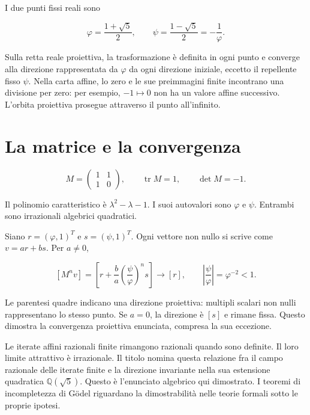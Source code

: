 \documentclass[10pt,a4paper]{article}
\begin{document}
I due punti fissi reali sono
\par

\[
\varphi=\frac{1+\sqrt5}{2},\qquad \psi=\frac{1-\sqrt5}{2}=-\frac1\varphi.
\]

Sulla retta reale proiettiva, la trasformazione è definita in ogni punto e converge alla direzione rappresentata da $\varphi$ da ogni direzione iniziale, eccetto il repellente fisso $\psi$. Nella carta affine, lo zero e le sue preimmagini finite incontrano una divisione per zero: per esempio, $-1\mapsto0$ non ha un valore affine successivo. L'orbita proiettiva prosegue attraverso il punto all'infinito.
\par

\section*{La matrice e la convergenza}

\[
M=\begin{pmatrix}1&1\\1&0\end{pmatrix},\qquad \operatorname{tr}M=1,\qquad \det M=-1.
\]

Il polinomio caratteristico è $\lambda^2-\lambda-1$. I suoi autovalori sono $\varphi$ e $\psi$. Entrambi sono irrazionali algebrici quadratici.
\par

Siano $r=(\varphi,1)^T$ e $s=(\psi,1)^T$. Ogni vettore non nullo si scrive come $v=ar+bs$. Per $a\ne0$,
\par

\[
[M^n v]=\left[r+\frac ba\left(\frac\psi\varphi\right)^n s\right]\longrightarrow[r],\qquad \left|\frac\psi\varphi\right|=\varphi^{-2}<1.
\]

Le parentesi quadre indicano una direzione proiettiva: multipli scalari non nulli rappresentano lo stesso punto. Se $a=0$, la direzione è $[s]$ e rimane fissa. Questo dimostra la convergenza proiettiva enunciata, compresa la sua eccezione.
\par

Le iterate affini razionali finite rimangono razionali quando sono definite. Il loro limite attrattivo è irrazionale. Il titolo nomina questa relazione fra il campo razionale delle iterate finite e la direzione invariante nella sua estensione quadratica $\mathbb Q(\sqrt5)$. Questo è l'enunciato algebrico qui dimostrato. I teoremi di incompletezza di Gödel riguardano la dimostrabilità nelle teorie formali sotto le proprie ipotesi.
\par
\end{document}
